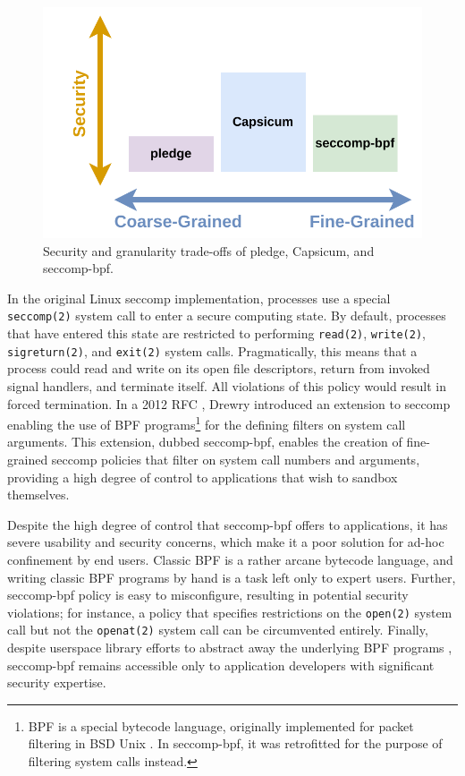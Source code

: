 \documentclass[dvipsnames, 12pt]{article}
\begin{document}
\begin{figure}[htpb]
    \centering
    \includegraphics[width=0.8\linewidth]{figs/systemcall-interposition.pdf}
    \caption{Security and granularity trade-offs of pledge,
    Capsicum, and seccomp-bpf.}%
    \label{fig:syscall_interposition}
\end{figure}

In the original Linux seccomp implementation, processes use a special
\texttt{seccomp(2)} system call to enter a secure computing state. By default,
processes that have entered this state are restricted to performing
\texttt{read(2)}, \texttt{write(2)}, \texttt{sigreturn(2)}, and \texttt{exit(2)}
system calls.  Pragmatically, this means that a process could read and write on
its open file descriptors, return from invoked signal handlers, and terminate
itself. All violations of this policy would result in forced termination. In
a 2012 RFC \cite{drewry2012_seccomp_bpf}, Drewry introduced an extension to
seccomp enabling the use of BPF programs\footnote{BPF is a special bytecode
language, originally implemented for packet filtering in BSD Unix
\cite{classic_bpf}. In seccomp-bpf, it was retrofitted for the purpose of
filtering system calls instead.} for the defining filters on system call
arguments. This extension, dubbed seccomp-bpf, enables the creation of
fine-grained seccomp policies that filter on system call numbers and arguments,
providing a high degree of control to applications that wish to sandbox
themselves.

Despite the high degree of control that seccomp-bpf offers to applications, it
has severe usability and security concerns, which make it a poor solution for
ad-hoc confinement by end users. Classic BPF \cite{classic_bpf} is a rather
arcane bytecode language, and writing classic BPF programs by hand is a task
left only to expert users. Further, seccomp-bpf policy is easy to misconfigure,
resulting in potential security violations; for instance, a policy that
specifies restrictions on the \texttt{open(2)} system call but not the
\texttt{openat(2)} system call can be circumvented entirely. Finally, despite
userspace library efforts to abstract away the underlying BPF programs
\cite{libseccomp}, seccomp-bpf remains accessible only to application developers
with significant security expertise.
\end{document}
